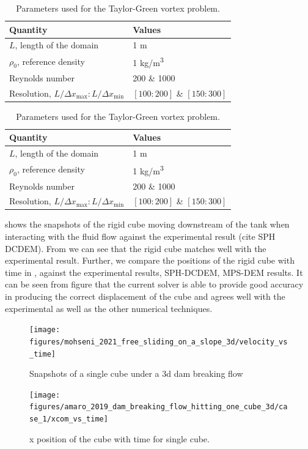 \documentclass[preprint,12pt]{elsarticle}
\begin{document}
\begin{table}[!ht]
  \centering
  \begin{tabular}[!ht]{ll}
    \toprule
    Quantity & Values\\
    \midrule
    $L$, length of the domain & 1 m \\
    $\rho_0$, reference density & 1 kg/m\textsuperscript{3} \\
    Reynolds number & 200 \& 1000 \\
    Resolution, $L/\Delta x_{\max} : L/\Delta x_{\min}$ & $[100:200]$ \& $[150:300]$\\
    \bottomrule
  \end{tabular}
  \caption{Parameters used for the Taylor-Green vortex problem.}%
  \label{tab:material-properties-3d-dam-breaking-flow-hitting-cubes}
\end{table}

\begin{table}[!ht]
  \centering
  \begin{tabular}[!ht]{ll}
    \toprule
    Quantity & Values\\
    \midrule
    $L$, length of the domain & 1 m \\
    $\rho_0$, reference density & 1 kg/m\textsuperscript{3} \\
    Reynolds number & 200 \& 1000 \\
    Resolution, $L/\Delta x_{\max} : L/\Delta x_{\min}$ & $[100:200]$ \& $[150:300]$\\
    \bottomrule
  \end{tabular}
  \caption{Parameters used for the Taylor-Green vortex problem.}%
  \label{tab:numerical-properties-3d-dam-breaking-flow-hitting-cubes}
\end{table}

 shows the snapshots of
the rigid cube moving downstream of the tank when interacting with the fluid
flow against the experimental result (cite SPH DCDEM). From
 we can see that the
rigid cube matches well with the experimental result. Further, we compare the
positions of the rigid cube with time in
, against the
experimental results, SPH-DCDEM, MPS-DEM results. It can be seen from figure
 that the current solver
is able to provide good accuracy in producing the correct displacement of the
cube and agrees well with the experimental as well as the other numerical
techniques.
\begin{figure}[!htpb]
  \centering
  \texttt{[image: figures/mohseni\_2021\_free\_sliding\_on\_a\_slope\_3d/velocity\_vs\_time]}
  \caption{Snapshots of a single cube under a 3d dam breaking flow}
\label{fig:snapshots-single-cube-3d-dam-breaking-flow}
\end{figure}
\begin{figure}[!htpb]
  \centering
  \texttt{[image: figures/amaro\_2019\_dam\_breaking\_flow\_hitting\_one\_cube\_3d/case\_1/xcom\_vs\_time]}
  \caption{x position of the cube with time for single cube.}
\label{fig:x-position-single-cube-3d-dam-breaking-flow}
\end{figure}
\end{document}
